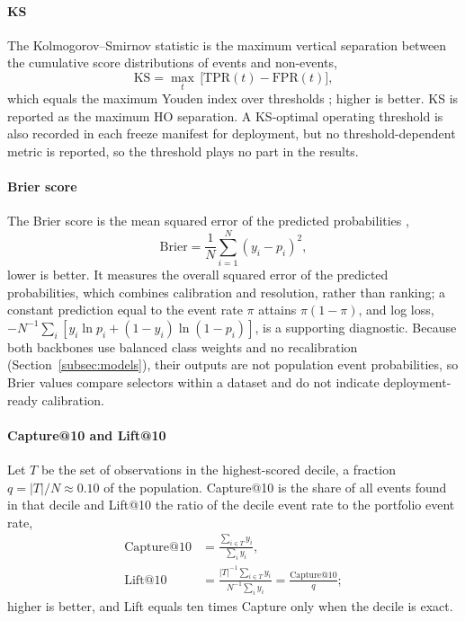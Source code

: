 \documentclass[final,5p,twocolumn]{elsarticle}
\newcommand{\KS}{\mathrm{KS}}
\newcommand{\TPR}{\mathrm{TPR}}
\newcommand{\FPR}{\mathrm{FPR}}
\begin{document}
\paragraph{KS}
The Kolmogorov--Smirnov statistic is the maximum vertical separation between the cumulative score distributions of events and non-events,
\begin{equation}
    \KS=\max_{t}\,\big[\TPR(t)-\FPR(t)\big],
    \label{eq:ks}
\end{equation}
which equals the maximum Youden index over thresholds \cite{youden1950}; higher is better. KS is reported as the maximum HO separation. A KS-optimal operating threshold is also recorded in each freeze manifest for deployment, but no threshold-dependent metric is reported, so the threshold plays no part in the results.

\paragraph{Brier score}
The Brier score is the mean squared error of the predicted probabilities \cite{brier1950},
\begin{equation}
    \mathrm{Brier}=\frac{1}{N}\sum_{i=1}^{N}(y_i-p_i)^2 ,
    \label{eq:brier}
\end{equation}
lower is better. It measures the overall squared error of the predicted probabilities, which combines calibration and resolution, rather than ranking; a constant prediction equal to the event rate $\pi$ attains $\pi(1-\pi)$, and log loss, $-N^{-1}\sum_i[y_i\ln p_i+(1-y_i)\ln(1-p_i)]$, is a supporting diagnostic. Because both backbones use balanced class weights and no recalibration (Section~\ref{subsec:models}), their outputs are not population event probabilities, so Brier values compare selectors within a dataset and do not indicate deployment-ready calibration.

\paragraph{Capture@10 and Lift@10}
Let $T$ be the set of observations in the highest-scored decile, a fraction $q=|T|/N\approx0.10$ of the population. Capture@10 is the share of all events found in that decile and Lift@10 the ratio of the decile event rate to the portfolio event rate,
\begin{equation}
\begin{aligned}
    \mathrm{Capture@10}&=\frac{\sum_{i\in T}y_i}{\sum_{i}y_i},\\
    \mathrm{Lift@10}&=\frac{|T|^{-1}\sum_{i\in T}y_i}{N^{-1}\sum_{i}y_i}=\frac{\mathrm{Capture@10}}{q};
\end{aligned}
    \label{eq:capture10}
\end{equation}
higher is better, and Lift equals ten times Capture only when the decile is exact.
\end{document}

